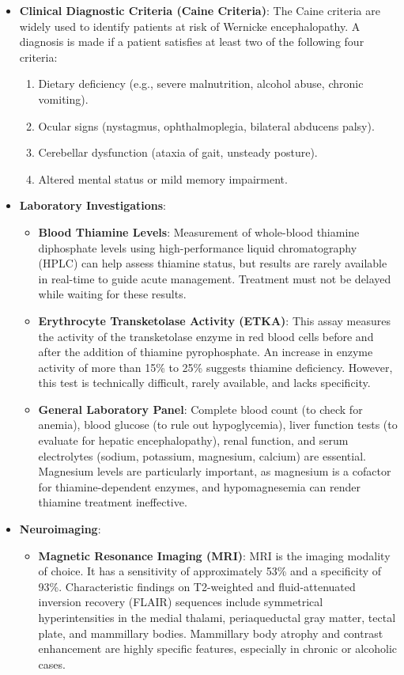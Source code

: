 \begin{itemize}
    \item \textbf{Clinical Diagnostic Criteria (Caine Criteria)}: The Caine criteria are widely used to identify patients at risk of Wernicke encephalopathy. A diagnosis is made if a patient satisfies at least two of the following four criteria:
    \begin{enumerate}
        \item Dietary deficiency (e.g., severe malnutrition, alcohol abuse, chronic vomiting).
        \item Ocular signs (nystagmus, ophthalmoplegia, bilateral abducens palsy).
        \item Cerebellar dysfunction (ataxia of gait, unsteady posture).
        \item Altered mental status or mild memory impairment.
    \end{enumerate}
    \item \textbf{Laboratory Investigations}:
    \begin{itemize}
        \item \textbf{Blood Thiamine Levels}: Measurement of whole-blood thiamine diphosphate levels using high-performance liquid chromatography (HPLC) can help assess thiamine status, but results are rarely available in real-time to guide acute management. Treatment must not be delayed while waiting for these results.
        \item \textbf{Erythrocyte Transketolase Activity (ETKA)}: This assay measures the activity of the transketolase enzyme in red blood cells before and after the addition of thiamine pyrophosphate. An increase in enzyme activity of more than 15\% to 25\% suggests thiamine deficiency. However, this test is technically difficult, rarely available, and lacks specificity.
        \item \textbf{General Laboratory Panel}: Complete blood count (to check for anemia), blood glucose (to rule out hypoglycemia), liver function tests (to evaluate for hepatic encephalopathy), renal function, and serum electrolytes (sodium, potassium, magnesium, calcium) are essential. Magnesium levels are particularly important, as magnesium is a cofactor for thiamine-dependent enzymes, and hypomagnesemia can render thiamine treatment ineffective.
    \end{itemize}
    \item \textbf{Neuroimaging}:
    \begin{itemize}
        \item \textbf{Magnetic Resonance Imaging (MRI)}: MRI is the imaging modality of choice. It has a sensitivity of approximately 53\% and a specificity of 93\%. Characteristic findings on T2-weighted and fluid-attenuated inversion recovery (FLAIR) sequences include symmetrical hyperintensities in the medial thalami, periaqueductal gray matter, tectal plate, and mammillary bodies. Mammillary body atrophy and contrast enhancement are highly specific features, especially in chronic or alcoholic cases.

\end{itemize}
\end{itemize}
